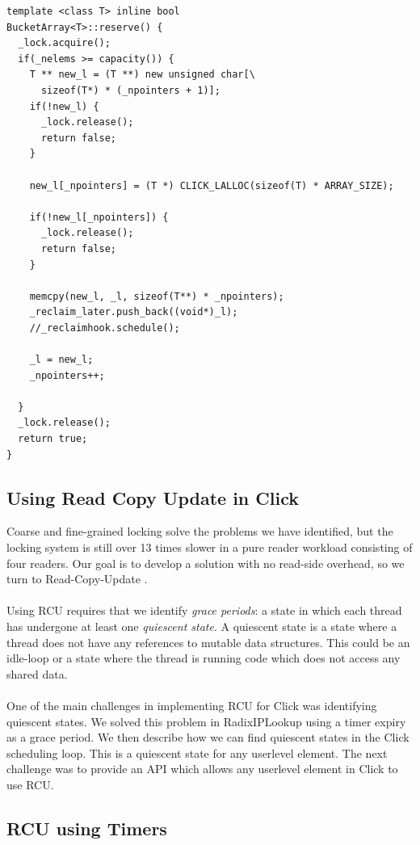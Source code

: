 \documentclass{article}
\begin{document}
\begin{lstlisting}[caption=Locking in reserve(), label=bucketvectorreservelisting]
template <class T> inline bool
BucketArray<T>::reserve() {
  _lock.acquire();
  if(_nelems >= capacity()) {
    T ** new_l = (T **) new unsigned char[\
      sizeof(T*) * (_npointers + 1)];
    if(!new_l) {
      _lock.release();
      return false;
    }
    
    new_l[_npointers] = (T *) CLICK_LALLOC(sizeof(T) * ARRAY_SIZE);
    
    if(!new_l[_npointers]) {
      _lock.release();
      return false;
    }
    
    memcpy(new_l, _l, sizeof(T**) * _npointers);
    _reclaim_later.push_back((void*)_l);
    //_reclaimhook.schedule();

    _l = new_l;
    _npointers++;
    
  }
  _lock.release();
  return true;
}
\end{lstlisting}
\subsection{Using Read Copy Update in Click}
Coarse and fine-grained locking solve the problems we have identified, but the locking system is still over 13 times slower in a pure reader workload consisting of four readers. Our goal is to develop a solution with no read-side overhead, so we turn to Read-Copy-Update \cite{readcopyupdate}.
\\\\ Using RCU requires that we identify \emph{grace periods}: a state in which each thread has undergone at least one \emph{quiescent state}. A quiescent state is a state where a thread does not have any references to mutable data structures. This could be an idle-loop or a state where the thread is running code which does not access any shared data.
\\\\ One of the main challenges in implementing RCU for Click was identifying quiescent states. We solved this problem in RadixIPLookup using a timer expiry as a grace period. We then describe how we can find quiescent states in the Click scheduling loop. This is a quiescent state for any userlevel element. The next challenge was to provide an API which allows any userlevel element in Click to use RCU. 
\subsection{RCU using Timers}\label{sec:rcutimers}
\end{document}
